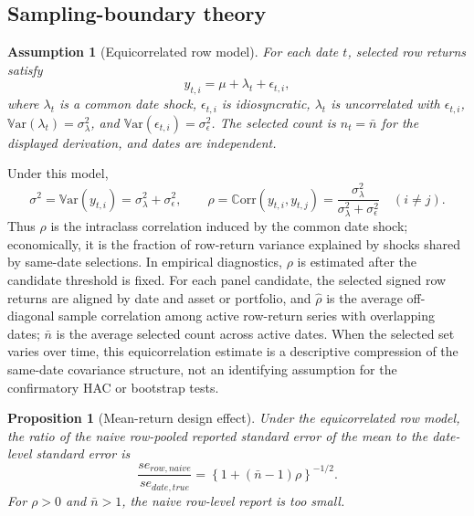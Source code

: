 \documentclass[12pt,a4paper]{article}
\newtheorem{assumption}{Assumption}
\newtheorem{proposition}{Proposition}
\newcommand{\Var}{\mathbb{V}\mathrm{ar}}
\newcommand{\Corr}{\mathbb{C}\mathrm{orr}}
\begin{document}
\subsection{Sampling-boundary theory}
\label{sec:theory}

\begin{assumption}[Equicorrelated row model]
For each date \(t\), selected row returns satisfy
\[
  y_{t,i}=\mu+\lambda_t+\epsilon_{t,i},
\]
where \(\lambda_t\) is a common date shock, \(\epsilon_{t,i}\) is
idiosyncratic, \(\lambda_t\) is uncorrelated with \(\epsilon_{t,i}\),
\(\Var(\lambda_t)=\sigma_\lambda^2\), and
\(\Var(\epsilon_{t,i})=\sigma_\epsilon^2\).  The selected count is
\(n_t=\bar n\) for the displayed derivation, and dates are independent.
\end{assumption}

Under this model,
\[
  \sigma^2=\Var(y_{t,i})=\sigma_\lambda^2+\sigma_\epsilon^2,
  \qquad
  \rho=\Corr(y_{t,i},y_{t,j})
       =\frac{\sigma_\lambda^2}{\sigma_\lambda^2+\sigma_\epsilon^2}
       \quad (i\ne j).
\]
Thus \(\rho\) is the intraclass correlation induced by the common date
shock; economically, it is the fraction of row-return variance explained
by shocks shared by same-date selections.
In empirical diagnostics, \(\rho\) is estimated after the candidate
threshold is fixed.  For each panel candidate, the selected signed row
returns are aligned by date and asset or portfolio, and
\(\hat\rho\) is the average off-diagonal sample correlation among active
row-return series with overlapping dates; \(\bar n\) is the average
selected count across active dates.  When the selected set varies over
time, this equicorrelation estimate is a descriptive compression of the
same-date covariance structure, not an identifying assumption for the
confirmatory HAC or bootstrap tests.

\begin{proposition}[Mean-return design effect]
Under the equicorrelated row model, the ratio of the naive row-pooled
reported standard error of the mean to the date-level standard error is
\[
  \frac{se_{row,naive}}{se_{date,true}}
  =
  \left\{1+(\bar n-1)\rho\right\}^{-1/2}.
\]
For \(\rho>0\) and \(\bar n>1\), the naive row-level report is too small.
\end{proposition}
\end{document}
